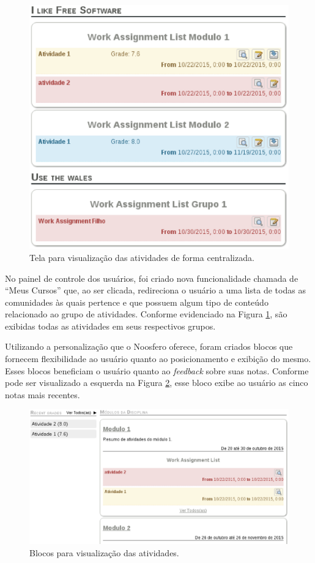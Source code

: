 \begin{figure}[h]
    \centering
    \includegraphics[keepaspectratio=true,scale=0.5]
      {figuras/work-assignment-group-list.eps}
    \caption{Tela para visualização das atividades de forma centralizada.}
    \label{fig:group-list}
\end{figure}

No painel de controle dos usuários, foi criado nova funcionalidade chamada de ``Meus Cursos'' que, ao ser clicada, redireciona o usuário a uma lista de todas as comunidades às quais pertence e que possuem algum tipo de conteúdo relacionado ao grupo de atividades. Conforme evidenciado na Figura \ref{fig:group-list}, são exibidas todas as atividades em seus respectivos grupos.

Utilizando a personalização que o Noosfero oferece, foram criados blocos que fornecem flexibilidade ao usuário quanto ao posicionamento e exibição do mesmo. Esses blocos beneficiam o usuário quanto ao \textit{feedback} sobre suas notas. Conforme pode ser visualizado a esquerda na Figura \ref{fig:blocos}, esse bloco exibe ao usuário as cinco notas mais recentes.

\begin{figure}[h]
    \centering
    \includegraphics[keepaspectratio=true,scale=0.5]
      {figuras/blocos.eps}
    \caption{Blocos para visualização das atividades.}
    \label{fig:blocos}
\end{figure}


